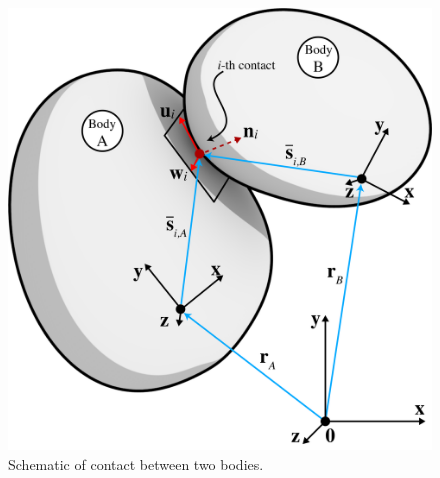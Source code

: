 \begin{figure}
	\begin{center}
		\includegraphics[width=.4\linewidth]{images/twobodies.png}
	\end{center}
	\caption{Schematic of contact between two bodies.}
	\label{fig:DVI_Contact}
\end{figure}